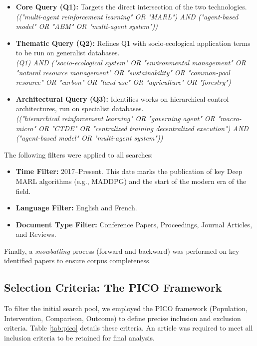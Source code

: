 \documentclass[conference]{IEEEtran}
\begin{document}
\begin{itemize}
    \item \textbf{Core Query (Q1):} Targets the direct intersection of the two technologies. \\
    \textit{(("multi-agent reinforcement learning" OR "MARL") AND ("agent-based model" OR "ABM" OR "multi-agent system"))}

    \item \textbf{Thematic Query (Q2):} Refines Q1 with socio-ecological application terms to be run on generalist databases. \\
    \textit{(Q1) AND ("socio-ecological system" OR "environmental management" OR "natural resource management" OR "sustainability" OR "common-pool resource" OR "carbon" OR "land use" OR "agriculture" OR "forestry")}

    \item \textbf{Architectural Query (Q3):} Identifies works on hierarchical control architectures, run on specialist databases. \\
    \textit{(("hierarchical reinforcement learning" OR "governing agent" OR "macro-micro" OR "CTDE" OR "centralized training decentralized execution") AND ("agent-based model" OR "multi-agent system"))}
\end{itemize}

The following filters were applied to all searches:
\begin{itemize}
    \item \textbf{Time Filter:} 2017--Present. This date marks the publication of key Deep MARL algorithms (e.g., MADDPG) and the start of the modern era of the field.
    \item \textbf{Language Filter:} English and French.
    \item \textbf{Document Type Filter:} Conference Papers, Proceedings, Journal Articles, and Reviews.
\end{itemize}

Finally, a \textit{snowballing} process (forward and backward) was performed on key identified papers to ensure corpus completeness.

\subsection{Selection Criteria: The PICO Framework}

To filter the initial search pool, we employed the PICO framework (Population, Intervention, Comparison, Outcome) to define precise inclusion and exclusion criteria. Table \ref{tab:pico} details these criteria. An article was required to meet all inclusion criteria to be retained for final analysis.
\end{document}
